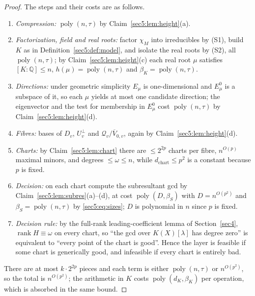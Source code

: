 \documentclass[journal]{IEEEtran}
\theoremstyle{plainn}
\theoremstyle{remark}
\newcommand{\rank}{\operatorname{rank}}
\newcommand{\poly}{\operatorname{poly}}
\begin{document}
\begin{proof}
The steps and their costs are as follows.
\begin{enumerate}[label=(\arabic*),leftmargin=*]
\item \emph{Compression:} $\poly(n,\tau)$ by Claim~\ref{sec5:lem:height}(a).
\item \emph{Factorization, field and real roots:} factor $\chi_M$ into irreducibles by (S1), build $K$
as in Definition~\ref{sec5:def:model}, and isolate the real roots by (S2), all $\poly(n,\tau)$; by
Claim~\ref{sec5:lem:height}(c) each real root $\mu$ satisfies $[K:\mathbb{Q}]\le n$,
$h(\mu)=\poly(n,\tau)$ and $\beta_K=\poly(n,\tau)$.
\item \emph{Directions:} under geometric simplicity $E_\mu$ is one-dimensional and $E_\mu^0$ is a
subspace of it, so each $\mu$ yields at most one candidate direction; the eigenvector and the test for
membership in $E_\mu^0$ cost $\poly(n,\tau)$ by Claim~\ref{sec5:lem:height}(d).
\item \emph{Fibres:} bases of $D_v$, $U_v^\perp$ and $\mathcal{Q}_v/\overline{V}_{0,v}$, again by
Claim~\ref{sec5:lem:height}(d).
\item \emph{Charts:} by Claim~\ref{sec5:lem:chart} there are $\le2^{2p}$ charts per fibre,
$n^{O(p)}$ maximal minors, and degrees $\le\omega\le n$, while $d_{\mathrm{chart}}\le p^{2}$ is a
constant because $p$ is fixed.
\item \emph{Decision:} on each chart compute the subresultant gcd by
Claim~\ref{sec5:lem:subres}(a)--(d), at cost $\poly(D,\beta_S)$ with $D=n^{O(p^{2})}$ and
$\beta_S=\poly(n,\tau)$ by \eqref{sec5:eq:sizes}; $D$ is polynomial in $n$ since $p$ is fixed.
\item \emph{Decision rule:} by the full-rank leading-coefficient lemma of Section~\ref{sec4},
$\rank H\equiv\omega$ on every chart, so ``the gcd over $K(X)[\lambda]$ has degree zero'' is equivalent
to ``every point of the chart is good''. Hence the layer is feasible if some chart is generically
good, and infeasible if every chart is entirely bad.
\end{enumerate}
There are at most $k\cdot2^{2p}$ pieces and each term is either $\poly(n,\tau)$ or $n^{O(p^{2})}$, so
the total is $n^{O(p^{2})}$; the arithmetic in $K$ costs $\poly(d_K,\beta_K)$ per operation, which is
absorbed in the same bound.
\end{proof}
\end{document}
